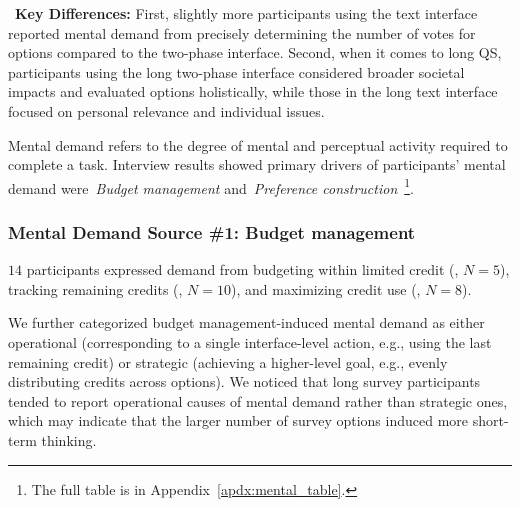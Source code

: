 \begin{tldrbox}
   \faKey~\textbf{Key Differences:} First, slightly more participants using the text interface reported mental demand from precisely determining the number of votes for options compared to the two-phase interface. Second, when it comes to long QS, participants using the long two-phase interface considered broader societal impacts and evaluated options holistically, while those in the long text interface focused on personal relevance and individual issues. %
\end{tldrbox}

Mental demand refers to the degree of mental and perceptual activity required to complete a task. Interview results showed primary drivers of participants' mental demand were~\textit{Budget management} and~\textit{Preference construction}~\footnote{The full table is in Appendix~\ref{apdx:mental_table}.}. %

\subsubsection{Mental Demand Source \#1: Budget management} $14$ participants expressed demand from budgeting within limited credit (, $N=5$), tracking remaining credits (, $N=10$), and maximizing credit use (, $N=8$).

We further categorized budget management-induced mental demand as either operational (corresponding to a single interface-level action, e.g., using the last remaining credit) or strategic (achieving a higher-level goal, e.g., evenly distributing credits across options).  We noticed that long survey participants tended to report operational causes of mental demand rather than strategic ones, which may indicate that the larger number of survey options induced more short-term thinking.

